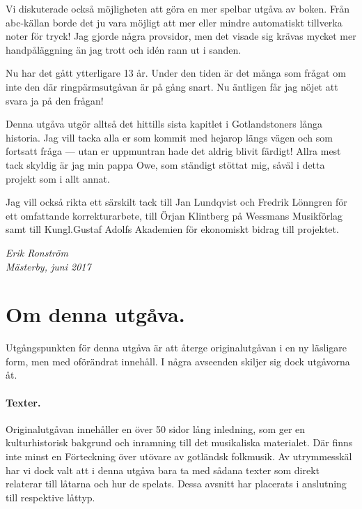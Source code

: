 {Vi diskuterade också möjligheten att göra en mer \guillemotright{}spelbar\guillemotright{}
utgåva av boken. Från abc-källan borde det ju vara möjligt att mer eller mindre
automatiskt tillverka noter för tryck! Jag gjorde några provsidor, men det visade sig
krävas mycket mer \guillemotright{}handpåläggning\guillemotright{} än jag trott och idén rann ut i sanden.

Nu har det gått ytterligare 13 år. Under den tiden är det många som frågat om inte
den där ringpärmsutgåvan är på gång snart. Nu äntligen får jag nöjet att svara ja på den frågan!

\bigskip

{
\setlength{\parindent}{0em}
Denna utgåva utgör alltså det hittills sista kapitlet i
Gotlandstoners långa historia. Jag vill tacka alla er som kommit med hejarop längs vägen
och som fortsatt fråga --- utan er uppmuntran hade det aldrig blivit färdigt! Allra mest
tack skyldig är jag min pappa Owe, som ständigt stöttat mig, såväl i detta projekt som i allt annat.
}

Jag vill också rikta ett särskilt tack till Jan Lundqvist och Fredrik Lönngren för ett omfattande
korrekturarbete, till Örjan Klintberg på Wessmans Musikförlag samt till Kungl.\@ Gustaf Adolfs Akademien
för ekonomiskt bidrag till projektet.

\bigskip

\begin{flushright}
\textit{Erik Ronström} \\
\textit{Mästerby, juni 2017}
\end{flushright}


\clearpage


\section*{\centering \LARGE Om denna utgåva.}\vspace{1cm}



Utgångspunkten för denna utgåva är att återge originalutgåvan i en ny läsligare
form, men med oförändrat innehåll. I några avseenden skiljer sig dock utgåvorna åt.

\paragraph{Texter.} Originalutgåvan innehåller en över 50 sidor lång inledning,
som ger en kulturhistorisk bakgrund och inramning till det musikaliska materialet.
Där finns inte minst en \guillemotright{}Förteckning över utövare av gotländsk
folkmusik\guillemotright{}.
Av utrymmesskäl har vi dock valt att i denna utgåva bara ta med sådana texter
som direkt relaterar till låtarna och hur de spelats. Dessa avsnitt
har placerats i anslutning till respektive låttyp.

}
